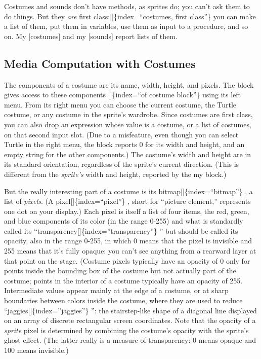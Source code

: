 \documentclass[
  letterpaper,
]{book}
\begin{document}
Costumes and sounds don't have methods, as sprites do; you can't ask
them to do things. But they \emph{are} first
class:{[}{]}\{index=``costumes, first class''\} you can make a list of
them, put them in variables, use them as input to a procedure, and so
on. My {[}costumes{]} and my {[}sounds{]} report lists of them.

\subsection{Media Computation with
Costumes}\label{media-computation-with-costumes}

The components of a costume are its name, width, height, and pixels. The
block gives access to these components {[}{]}\{index=``of costume
block''\} using its left menu. From its right menu you can choose the
current costume, the Turtle costume, or any costume in the sprite's
wardrobe. Since costumes are first class, you can also drop an
expression whose value is a costume, or a list of costumes, on that
second input slot. (Due to a misfeature, even though you can select
Turtle in the right menu, the block reports 0 for its width and height,
and an empty string for the other components.) The costume's width and
height are in its standard orientation, regardless of the sprite's
current direction. (This is different from the \emph{sprite's} width and
height, reported by the my block.)

But the really interesting part of a costume is its
bitmap{[}{]}\{index=``bitmap''\} , a list of \emph{pixels}. (A
pixel{[}{]}\{index=``pixel''\} , short for ``picture element,''
represents one dot on your display.) Each pixel is itself a list of four
items, the red, green, and blue components of its color (in the range
0-255) and what is standardly called its
``transparency{[}{]}\{index=''transparency''\} '' but should be called
its opacity, also in the range 0-255, in which 0 means that the pixel is
invisible and 255 means that it's fully opaque: you can't see anything
from a rearward layer at that point on the stage. (Costume pixels
typically have an opacity of 0 only for points inside the bounding box
of the costume but not actually part of the costume; points in the
interior of a costume typically have an opacity of 255. Intermediate
values appear mainly at the edge of a costume, or at sharp boundaries
between colors inside the costume, where they are used to reduce
``jaggies{[}{]}\{index=''jaggies''\} '': the stairstep-like shape of a
diagonal line displayed on an array of discrete rectangular screen
coordinates. Note that the opacity of a \emph{sprite} pixel is
determined by combining the costume's opacity with the sprite's ghost
effect. (The latter really is a measure of transparency: 0 means opaque
and 100 means invisible.)
\end{document}
